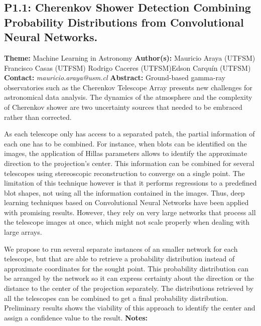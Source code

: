 \documentclass{report}
\begin{document}
{{{{{{{{{\subsection*{P1.1: Cherenkov Shower Detection Combining Probability Distributions from Convolutional Neural Networks.}
{\bf Theme:}  Machine Learning in Astronomy\newline
{\bf Author(s):}\newline
Mauricio Araya (UTFSM) \newline Francisco Casas (UTFSM) \newline  Rodrigo Caceres (UTFSM)\newline  Edson Carquín (UTFSM)\newline  \newline  \newline\newline
{\bf Contact:} {\it mauricio.araya@usm.cl}\newline
\newline\newline
{\bf Abstract:}\newline
Ground-based gamma-ray observatories such as the Cherenkov Telescope Array presents new challenges for astronomical data analysis. The dynamics of the atmosphere and the complexity of Cherenkov shower are two uncertainty sources that needed to be embraced rather than corrected.

As each telescope only has access to a separated patch, the partial information of each one has to be combined. For instance, when blots can be identified on the images, the application of Hillas parameters allows to identify the approximate direction to the projection's center. This information can be combined for several telescopes using stereoscopic reconstruction to converge on a single point. The limitation of this technique however is that it performs regressions to a predefined blot shapes, not using all the information contained in the images. Thus, deep learning techniques based on Convolutional Neural Networks have been applied with promising results. However, they rely on very large networks that process all the telescope images at once, which might not scale properly when dealing with large arrays.

We propose to run several separate instances of an smaller network for each telescope, but that are able to retrieve a probability distribution instead of approximate coordinates for the sought point. This probability distribution can be arranged by the network so it can express certainty about the direction or the distance to the center of the projection separately. The distributions retrieved by all the telescopes can be combined to get a final probability distribution. Preliminary results shows the viability of this approach to identify the center and assign a confidence value to the result.\newline
{\bf Notes:}\newline
{\newpage
}}}}}}}}}}
\end{document}
